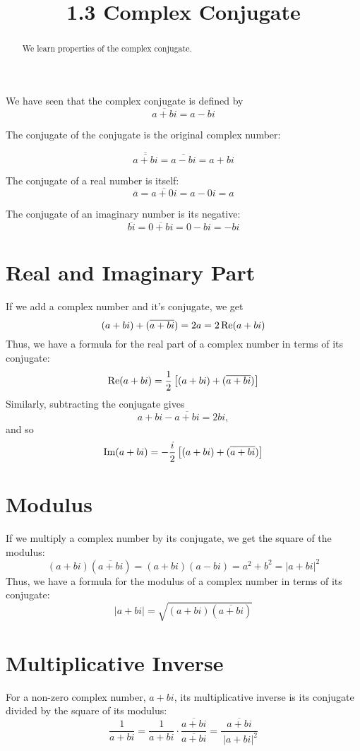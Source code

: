 \documentclass[handout]{ximera}
\title{1.3 Complex Conjugate}
\begin{document}
\begin{abstract}
We learn properties of the complex conjugate.
\end{abstract}

\maketitle



We have seen that the complex conjugate is defined by
\[
\overline{a+bi} = a-bi
\]

The conjugate of the conjugate is the original complex number:

\[
\overline{\overline{a+bi}} = \overline{a-bi} = a+bi
\]

The conjugate of a real number is itself:
\[
\overline{a}=\overline{a+0i} = a-0i = a
\]

The conjugate of an imaginary number is its negative:
\[
\overline{bi}=\overline{0+bi} = 0-bi = -bi
\]


\section{Real and Imaginary Part}


If we add a complex number and it's conjugate, we get
\[
(a+bi) + (\overline{a+bi}) = 2a = 2\operatorname{Re}(a+bi)
\]
Thus, we have a formula for the real part of a complex number in terms of its conjugate:
\[
\operatorname{Re}(a+bi) = \frac12 \left[(a+bi) + (\overline{a+bi})\right]
\]
Similarly, subtracting the conjugate gives 
\[
a+bi - \overline{a+bi} = 2bi,
\]
and so
\[
\operatorname{Im}(a+bi) = -\frac{i}{2}\left[(a+bi) + (\overline{a+bi})\right]
\]
 
\section{Modulus}

If we multiply a complex number by its conjugate, we get the square of the modulus:
\[
(a+bi)(\overline{a+bi}) = (a+bi)(a-bi) = a^2 + b^2 = |a+bi|^2
\]
Thus, we have a formula for the modulus of a complex number in terms of its conjugate:
\[
|a+bi|= \sqrt{(a+bi)(\overline{a+bi})}
\]


\section{Multiplicative Inverse}

For a non-zero complex number, $a+bi$, its multiplicative inverse is its conjugate divided by the square of its modulus:
\[
\frac{1}{a+bi} = \frac{1}{a+bi}\cdot \frac{\overline{a+bi}}{\overline{a+bi}} = \frac{\overline{a+bi}}{\ |a+bi|^2}
\]
\end{document}
